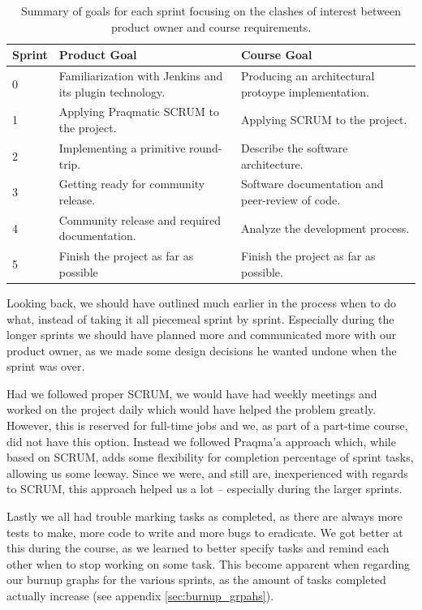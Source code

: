 \documentclass[a4paper,11pt]{article}
\begin{document}
\begin{table}
	\centering
	\begin{tabular}{| p{2cm} | p{5cm} | p{5cm} |}
		\hline
		Sprint & Product Goal & Course Goal \\
		\hline \hline
		0 & Familiarization with Jenkins and its plugin technology. & Producing
		an architectural protoype implementation. \\
		\hline
		1 & Applying Praqmatic SCRUM to the project. & Applying SCRUM to the
		project. \\
		\hline
		2 & Implementing a primitive round-trip. & Describe the software
		architecture. \\
		\hline
		3 & Getting ready for community release. & Software documentation and
		peer-review of code. \\
		\hline
		4 & Community release and required documentation. & Analyze the
		development process. \\
		\hline
		5 & Finish the project as far as possible & Finish the project as far
		as possible. \\
		\hline
	\end{tabular}
	\caption{Summary of goals for each sprint focusing on the clashes of
	interest between product owner and course requirements.}
	\label{tab:sprint_summary}
\end{table}

Looking back, we should have outlined much earlier in the process when to do
what, instead of taking it all piecemeal sprint by sprint. Especially during the
longer sprints we should have planned more and communicated more with our
product owner, as we made some design decisions he wanted undone when the
sprint was over.

Had we followed proper SCRUM, we would have had weekly meetings and worked on
the project daily which would have helped the problem greatly. However, this is
reserved for full-time jobs and we, as part of a part-time course, did not have
this option. Instead we followed Praqma'a approach which, while based on SCRUM,
adds some flexibility for completion percentage of sprint tasks, allowing us
some leeway. Since we were, and still are, inexperienced with regards to SCRUM,
this approach helped us a lot -- especially during the larger sprints.

Lastly we all had trouble marking tasks as completed, as there are always more
tests to make, more code to write and more bugs to eradicate. We got better at
this during the course, as we learned to better specify tasks and remind each
other when to stop working on some task. This become apparent when regarding our
burnup graphs for the various sprints, as the amount of tasks completed actually
increase (see appendix \ref{sec:burnup_grpahs}).
\end{document}

